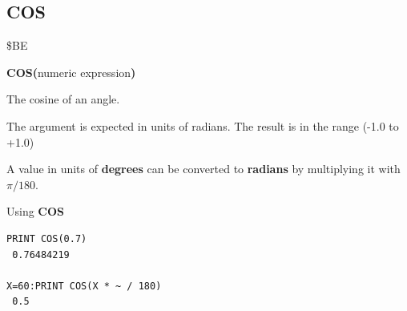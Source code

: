 
\newpage
\subsection{COS}
\begin{description}[leftmargin=2cm,style=nextline]
\item [Token:] \$BE
\item [Format:] {\bf COS(}numeric expression{\bf )}
\item [Returns:] The cosine of an angle.

               The argument is expected in units of radians.
               The result is in the range (-1.0 to +1.0)

\item [Remarks:] A value in units of {\bf degrees}
                 can be converted to {\bf radians}
                 by multiplying it with $\pi/180$.
\item [Examples:] Using {\bf COS}
\begin{tcolorbox}[colback=black,coltext=white]
\verbatimfont{\codefont}
\begin{verbatim}
PRINT COS(0.7)
 0.76484219

X=60:PRINT COS(X * ~ / 180)
 0.5
\end{verbatim}
\end{tcolorbox}
\end{description}


\newpage
